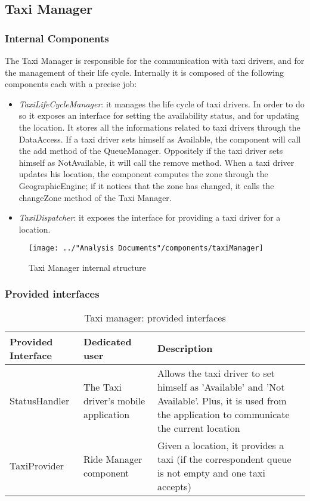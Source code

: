 \subsection{Taxi Manager}\label{comp:taxiManager}
\subsubsection{Internal Components}
The Taxi Manager is responsible for the communication with taxi drivers, and for the management of their life cycle. Internally it is composed of the following components each with a precise job:
\begin{itemize}
	\item \textit{TaxiLifeCycleManager}: it manages the life cycle of taxi drivers. In order to do so it exposes an interface for setting the availability status, and for updating the location. It stores all the informations related to taxi drivers through the DataAccess. If a taxi driver sets himself as Available, the component will call the add method of the QueueManager. Oppositely if the taxi driver sets himself as NotAvailable, it will call the remove method. When a taxi driver updates his location, the component computes the zone through the GeographicEngine; if it notices that the zone has changed, it calls the changeZone method of the Taxi Manager.
	\item \textit{TaxiDispatcher}: it exposes the interface for providing a taxi driver for a location.
\end{itemize}
\begin{figure}[H]
	\centering
	\texttt{[image: ../"Analysis Documents"/components/taxiManager]}
	\label{fig:taximanager}
	\caption{Taxi Manager internal structure}
\end{figure}
\subsubsection{Provided interfaces}
\begin{table}[H]
	\begin{longtable}{| p{} | p{} | p{} |}
		\hline
		\textbf{Provided Interface} & \textbf{Dedicated user} & \textbf{Description} \\ \hline
		StatusHandler & The Taxi driver's mobile application & Allows the taxi driver to set himself as 'Available' and 'Not Available'. Plus, it is used from the application to communicate the current location \\ \hline
		TaxiProvider & Ride Manager component & Given a location, it provides a taxi (if the correspondent queue is not empty and one taxi accepts) \\ \hline
	\end{longtable}
	\caption{Taxi manager: provided interfaces}
	\label{tab:taximanager:providedInterfaces}
\end{table}
